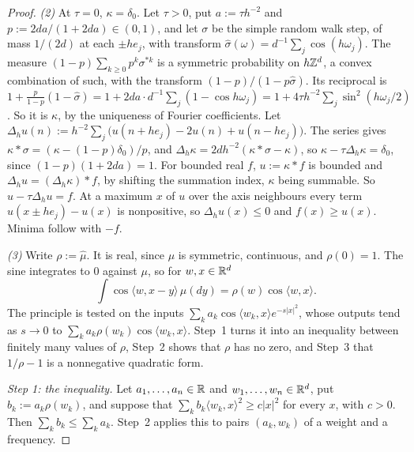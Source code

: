 \begin{proof}
\emph{(2)} At $\tau = 0$, $\kappa = \delta_0$. Let $\tau > 0$, put $a := \tau h^{-2}$ and
$p := 2da/(1 + 2da) \in (0, 1)$, and let $\sigma$ be the simple random walk step, of mass $1/(2d)$ at
each $\pm he_j$, with transform $\widehat\sigma(\omega) = d^{-1}\sum_j\cos(h\omega_j)$. The
measure $(1 - p)\sum_{k \ge 0}p^k\sigma^{*k}$ is a symmetric probability on $h\mathbb{Z}^d$, a convex
combination of such, with the transform $(1 - p)/(1 - p\widehat\sigma)$. Its reciprocal is
$1 + \frac{p}{1 - p}(1 - \widehat\sigma) = 1 + 2da\cdot d^{-1}\sum_j(1 - \cos h\omega_j) =
1 + 4\tau h^{-2}\sum_j\sin^2(h\omega_j/2)$. So it is $\kappa$, by the uniqueness of Fourier
coefficients.
Let $\Delta_hu(n) := h^{-2}\sum_j\bigl(u(n + he_j) - 2u(n) + u(n - he_j)\bigr)$. The series gives
$\kappa * \sigma = (\kappa - (1 - p)\delta_0)/p$, and $\Delta_h\kappa = 2dh^{-2}(\kappa * \sigma -
\kappa)$, so $\kappa - \tau\Delta_h\kappa = \delta_0$, since $(1 - p)(1 + 2da) = 1$. For bounded real
$f$, $u := \kappa * f$ is bounded and $\Delta_hu = (\Delta_h\kappa) * f$, by shifting the summation
index, $\kappa$ being summable. So $u - \tau\Delta_hu = f$. At a maximum $x$ of $u$ over the axis
neighbours every term $u(x \pm he_j) - u(x)$ is nonpositive, so $\Delta_hu(x) \le 0$ and
$f(x) \ge u(x)$. Minima follow with $-f$.

\emph{(3)}
Write $\rho := \widehat\mu$. It is real, since $\mu$ is symmetric, continuous, and $\rho(0) = 1$.
The sine integrates to $0$ against $\mu$, so for $w, x \in \mathbb{R}^d$
\[
  \int\cos\langle w, x - y\rangle\,\mu(dy) = \rho(w)\cos\langle w, x\rangle .
\]
The principle is tested on the inputs $\sum_ka_k\cos\langle w_k, x\rangle e^{-s|x|^2}$, whose
outputs tend as $s \to 0$ to $\sum_ka_k\rho(w_k)\cos\langle w_k, x\rangle$. Step~1 turns it into an
inequality between finitely many values of $\rho$, Step~2 shows that $\rho$ has no zero, and
Step~3 that $1/\rho - 1$ is a nonnegative quadratic form.

\emph{Step 1: the inequality.} Let $a_1, \dots, a_n \in \mathbb{R}$ and $w_1, \dots, w_n \in \mathbb{R}^d$, put
$b_k := a_k\rho(w_k)$, and suppose that $\sum_kb_k\langle w_k, x\rangle^2 \ge c|x|^2$ for every $x$,
with $c > 0$. Then $\sum_kb_k \le \sum_ka_k$. Step~2 applies this to pairs $(a_k, w_k)$ of a
weight and a frequency.


\end{proof}
